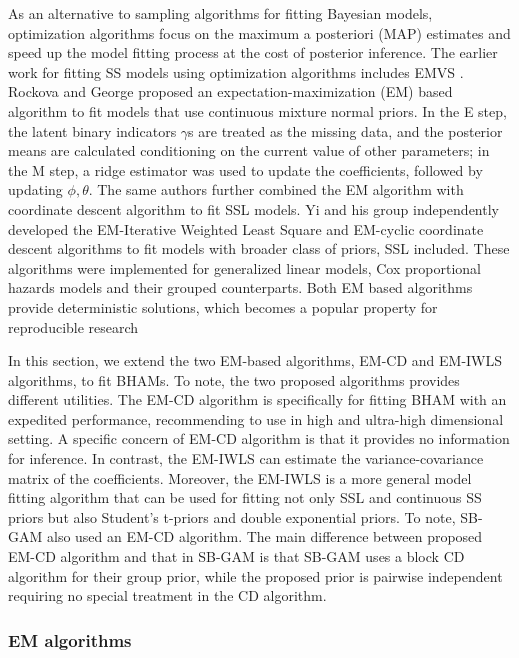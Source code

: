 \documentclass[AMA,STIX1COL,]{WileyNJD-v2}
\begin{document}
As an alternative to sampling algorithms for fitting Bayesian models,
optimization algorithms focus on the maximum a posteriori (MAP)
estimates and speed up the model fitting process at the cost of
posterior inference. The earlier work for fitting SS models using
optimization algorithms includes EMVS \citep{Rockova2014a}. Rockova and
George\citep{Rockova2014a} proposed an expectation-maximization (EM)
based algorithm to fit models that use continuous mixture normal priors.
In the E step, the latent binary indicators \(\gamma\)s are treated as
the missing data, and the posterior means are calculated conditioning on
the current value of other parameters; in the M step, a ridge estimator
was used to update the coefficients, followed by updating
\(\phi, \theta\). The same authors \citep{Rockova2018b, Rockova2018}
further combined the EM algorithm with coordinate descent algorithm to
fit SSL models. Yi and his group independently developed the
EM-Iterative Weighted Least Square and EM-cyclic coordinate descent
algorithms to fit models with broader class of priors, SSL
included.\citep{Yi2019} These algorithms were implemented for
generalized linear models\citep{Tang2017a}, Cox proportional hazards
models \citep{Tang2017} and their grouped
counterparts\citep{Tang2018, Tang2019}. Both EM based algorithms provide
deterministic solutions, which becomes a popular property for
reproducible research

In this section, we extend the two EM-based algorithms, EM-CD and
EM-IWLS algorithms, to fit BHAMs. To note, the two proposed algorithms
provides different utilities. The EM-CD algorithm is specifically for
fitting BHAM with an expedited performance, recommending to use in high
and ultra-high dimensional setting. A specific concern of EM-CD
algorithm is that it provides no information for inference. In contrast,
the EM-IWLS can estimate the variance-covariance matrix of the
coefficients. Moreover, the EM-IWLS is a more general model fitting
algorithm that can be used for fitting not only SSL and continuous SS
priors but also Student's t-priors and double exponential priors. To
note, SB-GAM\citep{Bai2020, Bai2021} also used an EM-CD algorithm. The
main difference between proposed EM-CD algorithm and that in SB-GAM is
that SB-GAM uses a block CD algorithm for their group prior, while the
proposed prior is pairwise independent requiring no special treatment in
the CD algorithm.

\subsubsection{EM algorithms}
\end{document}
